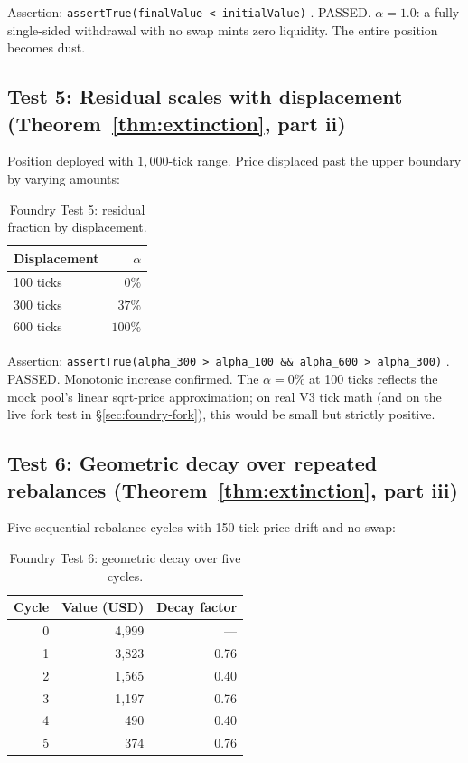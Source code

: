 \documentclass[11pt,a4paper]{article}
\begin{document}
Assertion: \texttt{assertTrue(finalValue < initialValue)} . PASSED. $\alpha = 1.0$: a fully single-sided withdrawal with no swap mints zero liquidity. The entire position becomes dust.

\subsection{Test 5: Residual scales with displacement (Theorem~\ref{thm:extinction}, part ii)}\label{sec:foundry-displacement}

Position deployed with $1{,}000$-tick range. Price displaced past the upper boundary by varying amounts:

\begin{table}[H]
\centering
\caption{Foundry Test 5: residual fraction by displacement.}\label{tab:foundry-displacement}
\begin{tabular}{@{}lr@{}}
\toprule
Displacement & $\alpha$ \\
\midrule
100 ticks & $0\%$ \\
300 ticks & $37\%$ \\
600 ticks & $100\%$ \\
\bottomrule
\end{tabular}
\end{table}

Assertion: \texttt{assertTrue(alpha\_300 > alpha\_100 \&\& alpha\_600 > alpha\_300)} . PASSED. Monotonic increase confirmed. The $\alpha = 0\%$ at 100 ticks reflects the mock pool's linear sqrt-price approximation; on real V3 tick math (and on the live fork test in \S\ref{sec:foundry-fork}), this would be small but strictly positive.

\subsection{Test 6: Geometric decay over repeated rebalances (Theorem~\ref{thm:extinction}, part iii)}\label{sec:foundry-decay}

Five sequential rebalance cycles with 150-tick price drift and no swap:

\begin{table}[H]
\centering
\caption{Foundry Test 6: geometric decay over five cycles.}\label{tab:foundry-decay}
\begin{tabular}{@{}rrr@{}}
\toprule
Cycle & Value (USD) & Decay factor \\
\midrule
0 & 4{,}999 & --- \\
1 & 3{,}823 & 0.76 \\
2 & 1{,}565 & 0.40 \\
3 & 1{,}197 & 0.76 \\
4 & 490     & 0.40 \\
5 & 374     & 0.76 \\
\bottomrule
\end{tabular}
\end{table}
\end{document}
